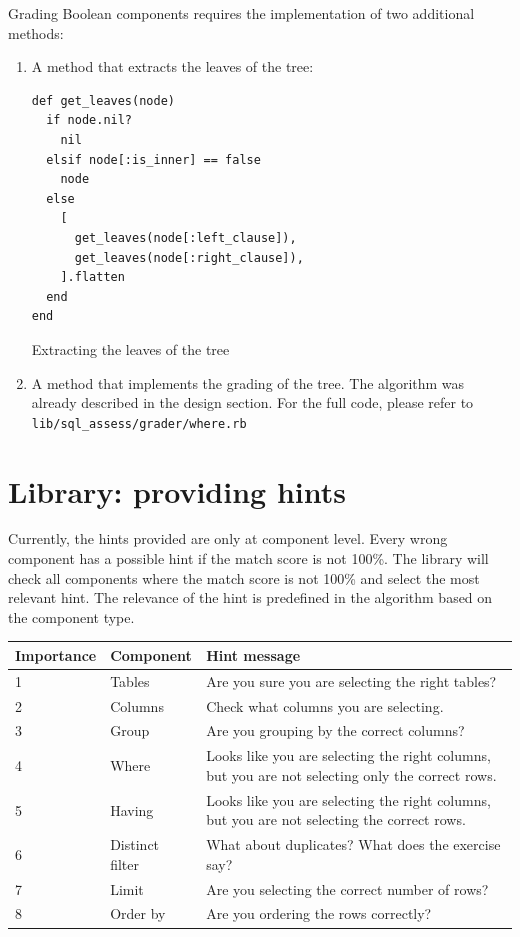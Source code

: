 Grading Boolean components requires the implementation of two additional methods:
\begin{enumerate}
    \item A method that extracts the leaves of the tree:
    \begin{code}
    \begin{verbatim}
def get_leaves(node)
  if node.nil?
    nil
  elsif node[:is_inner] == false
    node
  else
    [
      get_leaves(node[:left_clause]),
      get_leaves(node[:right_clause]),
    ].flatten
  end
end
    \end{verbatim}
    \caption{Extracting the leaves of the tree}
    \end{code}
    \item A method that implements the grading of the tree. The algorithm was already described in the design section. For the full code, please refer to \texttt{lib/sql\_assess/grader/where.rb} 
\end{enumerate}

\section{Library: providing hints}

Currently, the hints provided are only at component level. Every wrong component has a possible hint if the match score is not 100\%. The library will check all components where the match score is not 100\% and select the most relevant hint. The relevance of the hint is predefined in the algorithm based on the component type.

\begin{tabularx}{\textwidth}{|l|X|X|}
\hline
\textbf{Importance} & \textbf{Component} &
\textbf{Hint message}\\\hline
\endhead
1 & Tables & Are you sure you are selecting the right tables? \\\hline
2 & Columns & Check what columns you are selecting. \\\hline
3 & Group & Are you grouping by the correct columns? \\\hline
4 & Where & Looks like you are selecting the right columns, but you are not selecting only the correct rows. \\\hline
5 & Having & Looks like you are selecting the right columns, but you are not selecting the correct rows. \\\hline
6 & Distinct filter & What about duplicates? What does the exercise say? \\\hline
7 & Limit & Are you selecting the correct number of rows? \\\hline
8 & Order by & Are you ordering the rows correctly? \\\hline

\end{tabularx}

